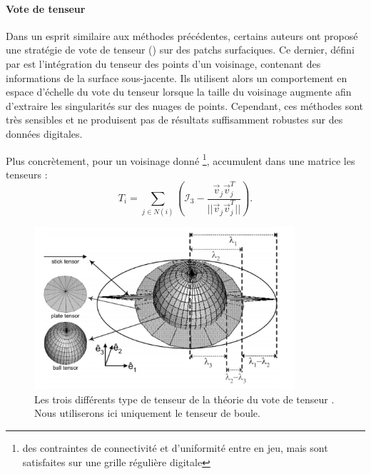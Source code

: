\paragraph{Vote de tenseur}
%
%
Dans un esprit similaire aux méthodes précédentes, certains auteurs
\cite{Park2012} ont proposé une stratégie de vote de tenseur () sur des patchs surfaciques. Ce dernier, défini par
 est l'intégration du tenseur des points d'un
voisinage, contenant des informations de la surface sous-jacente. Ils utilisent
alors un comportement en espace d'échelle du vote du tenseur lorsque la taille du
voisinage augmente afin d'extraire les singularités sur des nuages de points.
Cependant, ces méthodes sont très sensibles et ne produisent pas de résultats
suffisamment robustes sur des données digitales.


Plus concrètement, pour un voisinage donné \footnote{des contraintes de
connectivité et d'uniformité entre en jeu, mais sont satisfaites sur une grille
régulière digitale},  accumulent dans une matrice les
tenseurs :
%
\begin{equation}
  T_i = \sum\limits_{j \in N(i)} \left(\mathcal{I}_3 - \frac{\overrightarrow{v}_j\overrightarrow{v}_j^T}{||\overrightarrow{v}_j\overrightarrow{v}_j^T||} \right) .
\end{equation}

\begin{figure}[ht]{
    \begin{center}
    \includegraphics[height=6cm]{images/Feature/Tensor_voting_notations}
    \end{center}}
    \caption{Les trois différents type de tenseur de la théorie du vote de tenseur \cite{Medioni2000-2}. Nous utiliserons ici uniquement le tenseur de boule.
      \label{fig:TV-multiscale}}
\end{figure}

